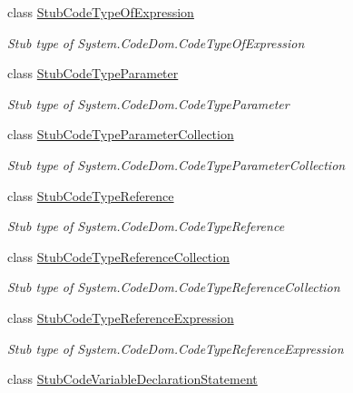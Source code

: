 \begin{DoxyCompactItemize}
class \hyperlink{class_system_1_1_code_dom_1_1_fakes_1_1_stub_code_type_of_expression}{Stub\-Code\-Type\-Of\-Expression}
\begin{DoxyCompactList}\small\item\em Stub type of System.\-Code\-Dom.\-Code\-Type\-Of\-Expression\end{DoxyCompactList}\item 
class \hyperlink{class_system_1_1_code_dom_1_1_fakes_1_1_stub_code_type_parameter}{Stub\-Code\-Type\-Parameter}
\begin{DoxyCompactList}\small\item\em Stub type of System.\-Code\-Dom.\-Code\-Type\-Parameter\end{DoxyCompactList}\item 
class \hyperlink{class_system_1_1_code_dom_1_1_fakes_1_1_stub_code_type_parameter_collection}{Stub\-Code\-Type\-Parameter\-Collection}
\begin{DoxyCompactList}\small\item\em Stub type of System.\-Code\-Dom.\-Code\-Type\-Parameter\-Collection\end{DoxyCompactList}\item 
class \hyperlink{class_system_1_1_code_dom_1_1_fakes_1_1_stub_code_type_reference}{Stub\-Code\-Type\-Reference}
\begin{DoxyCompactList}\small\item\em Stub type of System.\-Code\-Dom.\-Code\-Type\-Reference\end{DoxyCompactList}\item 
class \hyperlink{class_system_1_1_code_dom_1_1_fakes_1_1_stub_code_type_reference_collection}{Stub\-Code\-Type\-Reference\-Collection}
\begin{DoxyCompactList}\small\item\em Stub type of System.\-Code\-Dom.\-Code\-Type\-Reference\-Collection\end{DoxyCompactList}\item 
class \hyperlink{class_system_1_1_code_dom_1_1_fakes_1_1_stub_code_type_reference_expression}{Stub\-Code\-Type\-Reference\-Expression}
\begin{DoxyCompactList}\small\item\em Stub type of System.\-Code\-Dom.\-Code\-Type\-Reference\-Expression\end{DoxyCompactList}\item 
class \hyperlink{class_system_1_1_code_dom_1_1_fakes_1_1_stub_code_variable_declaration_statement}{Stub\-Code\-Variable\-Declaration\-Statement}

\end{DoxyCompactItemize}
